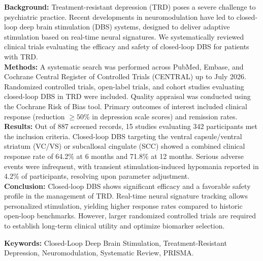 \begin{tcolorbox}[elegantbox, title=Structured Abstract, colback=bglight]
  \noindent
  \textbf{Background:} Treatment-resistant depression (TRD) poses a severe challenge to psychiatric practice. Recent developments in neuromodulation have led to closed-loop deep brain stimulation (DBS) systems, designed to deliver adaptive stimulation based on real-time neural signatures. We systematically reviewed clinical trials evaluating the efficacy and safety of closed-loop DBS for patients with TRD. \\
  
  \noindent
  \textbf{Methods:} A systematic search was performed across PubMed, Embase, and Cochrane Central Register of Controlled Trials (CENTRAL) up to July 2026. Randomized controlled trials, open-label trials, and cohort studies evaluating closed-loop DBS in TRD were included. Quality appraisal was conducted using the Cochrane Risk of Bias tool. Primary outcomes of interest included clinical response (reduction $\ge 50$\% in depression scale scores) and remission rates. \\
  
  \noindent
  \textbf{Results:} Out of 887 screened records, 15 studies evaluating 342 participants met the inclusion criteria. Closed-loop DBS targeting the ventral capsule/ventral striatum (VC/VS) or subcallosal cingulate (SCC) showed a combined clinical response rate of 64.2\% at 6 months and 71.8\% at 12 months. Serious adverse events were infrequent, with transient stimulation-induced hypomania reported in 4.2\% of participants, resolving upon parameter adjustment. \\
  
  \noindent
  \textbf{Conclusion:} Closed-loop DBS shows significant efficacy and a favorable safety profile in the management of TRD. Real-time neural signature tracking allows personalized stimulation, yielding higher response rates compared to historic open-loop benchmarks. However, larger randomized controlled trials are required to establish long-term clinical utility and optimize biomarker selection.
  
  \medskip
  \textbf{Keywords:} Closed-Loop Deep Brain Stimulation, Treatment-Resistant Depression, Neuromodulation, Systematic Review, PRISMA.
\end{tcolorbox}
